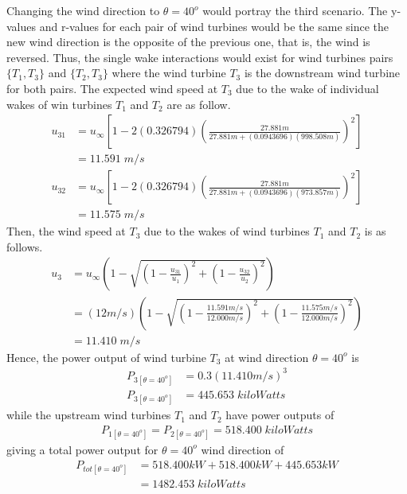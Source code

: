     Changing the wind direction to $\theta=40^o$ would portray the third scenario. The y-values and r-values for each pair of wind turbines would be the same since the new wind direction is the opposite of the previous one, that is, the wind is reversed. Thus, the single wake interactions would exist for wind turbines pairs $\{T_1,T_3\}$ and $\{T_2,T_3\}$ where the wind turbine $T_3$ is the downstream wind turbine for both pairs. The expected wind speed at $T_3$ due to the wake of individual wakes of win turbines $T_1$ and $T_2$ are as follow.
    \begin{align*}
        u_{31} &= u_\infty \left[ 1-2(0.326794)\left( \frac{27.881m}{27.881m+(0.0943696) (998.508m)} \right)^2 \right] \\
        &=11.591\;m/s
    \end{align*}
    \begin{align*}
        u_{32} &= u_\infty \left[ 1-2(0.326794)\left( \frac{27.881m}{27.881m+(0.0943696) (973.857m)} \right)^2 \right] \\
        &=11.575\;m/s
    \end{align*}
    Then, the wind speed at $T_3$ due to the wakes of wind turbines $T_1$ and $T_2$ is as follows.
    \begin{align*}
        u_3 &= u_\infty\left( 1-\sqrt{\left( 1-\frac{u_{31}}{u_1} \right)^2 + \left( 1-\frac{u_{32}}{u_2} \right)^2} \right) \\
        &= (12m/s)\left( 1-\sqrt{\left( 1-\frac{11.591m/s}{12.000m/s} \right)^2 + \left( 1-\frac{11.575m/s}{12.000m/s} \right)^2} \right) \\
        &= 11.410\;m/s
    \end{align*}
    Hence, the power output of wind turbine $T_3$ at wind direction $\theta=40^o$ is
    \begin{align*}
        P_{3[\theta=40^o]} &= 0.3(11.410m/s)^3 \\
        P_{3[\theta=40^o]} &= 445.653\;kiloWatts
    \end{align*}
    while the upstream wind turbines $T_1$ and $T_2$ have power outputs of
    \begin{align*}
        P_{1[\theta=40^o]}=P_{2[\theta=40^o]} = 518.400\;kiloWatts
    \end{align*}
   giving a total power output for $\theta=40^o$ wind direction of
	\begin{align*}
		P_{tot[\theta=40^o]} &= 518.400kW + 518.400kW + 445.653kW \\
		&=1482.453\;kiloWatts
	\end{align*}
	
